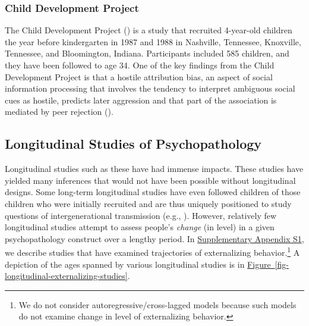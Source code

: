 \documentclass[
  american,
  letterpaper,
  12pt]{article}
\begin{document}
\subsubsection{Child Development
Project}\label{child-development-project}

The Child Development Project () is a study that recruited 4-year-old children the year before
kindergarten in 1987 and 1988 in Nashville, Tennessee, Knoxville,
Tennessee, and Bloomington, Indiana. Participants included 585 children,
and they have been followed to age 34. One of the key findings from the
Child Development Project is that a hostile attribution bias, an aspect
of social information processing that involves the tendency to interpret
ambiguous social cues as hostile, predicts later aggression and that
part of the association is mediated by peer rejection
().

\subsection{Longitudinal Studies of
Psychopathology}\label{longitudinal-studies-of-psychopathology}

Longitudinal studies such as these have had immense impacts. These
studies have yielded many inferences that would not have been possible
without longitudinal designs. Some long-term longitudinal studies have
even followed children of those children who were initially recruited
and are thus uniquely positioned to study questions of intergenerational
transmission (e.g., ). However,
relatively few longitudinal studies attempt to assess people's
\emph{change} (in level) in a given psychopathology construct over a
lengthy period. In
\href{notebooks/supplement.qmd\#sec-longitudinalExternalizingStudies}{Supplementary
Appendix S1}, we describe studies that have examined trajectories of
externalizing behavior.\footnote{We do not consider
  autoregressive/cross-lagged models because such models do not examine
  change in level of externalizing behavior.} A depiction of the ages
spanned by various longitudinal studies is in
\hyperref[fig-longitudinal-externalizing-studies]{Figure~\ref*{fig-longitudinal-externalizing-studies}}.

\par\addvspace{\baselineskip}\begingroup

\setlength{\parindent}{0pt}

\captionsetup{type=figure}
\end{document}
